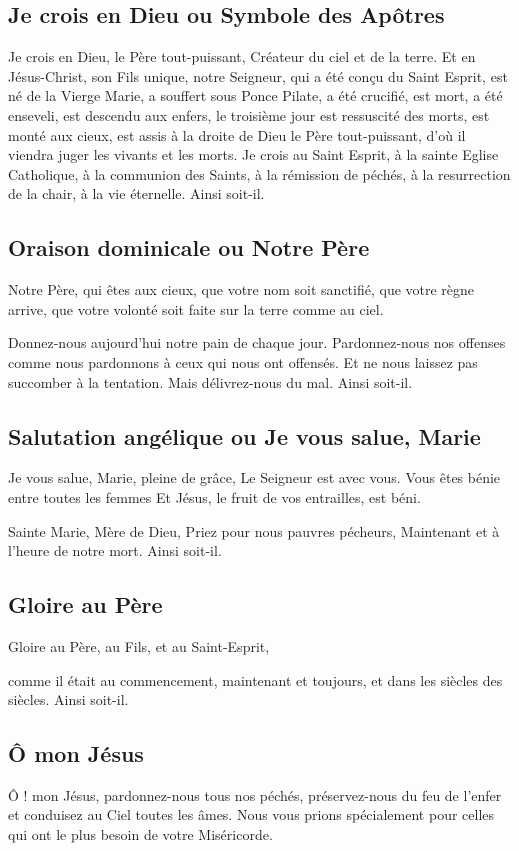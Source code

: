 
\subsection[Je crois en Dieu]{Je crois en Dieu ou Symbole des Apôtres}
Je crois en Dieu, le Père tout-puissant, Créateur du ciel et de la terre.
Et en Jésus-Christ, son Fils unique, notre Seigneur,
qui a été conçu du Saint Esprit, est né de la Vierge Marie,
a souffert sous Ponce Pilate, a été crucifié, est mort, a été enseveli,
est descendu aux enfers, le troisième jour est ressuscité des morts,
est monté aux cieux,
est assis à la droite de Dieu le Père tout-puissant,
d’où il viendra juger les vivants et les morts.
Je crois au Saint Esprit,
à la sainte Eglise Catholique,
à la communion des Saints,
à la rémission de péchés,
à la resurrection de la chair,
à la vie éternelle.
Ainsi soit-il.

\subsection[Notre Père]{Oraison dominicale ou Notre Père}
Notre Père, qui êtes aux cieux,
que votre nom soit sanctifié, que votre règne arrive,
que votre volonté soit faite sur la terre comme au ciel.

Donnez-nous aujourd’hui notre pain de chaque jour.
Pardonnez-nous nos offenses comme nous pardonnons à ceux qui nous ont offensés.
Et ne nous laissez pas succomber à la tentation.
Mais délivrez-nous du mal.
Ainsi soit-il.

\subsection[Je vous salue Marie]{Salutation angélique ou Je vous salue, Marie}
Je vous salue, Marie, pleine de grâce,
Le Seigneur est avec vous.
Vous êtes bénie entre toutes les femmes
Et Jésus, le fruit de vos entrailles, est béni.

Sainte Marie, Mère de Dieu,
Priez pour nous pauvres pécheurs,
Maintenant et à l’heure de notre mort.
Ainsi soit-il.

\subsection{Gloire au Père}
Gloire au Père, au Fils, et au Saint-Esprit,

comme il était au commencement, maintenant et toujours, et dans les siècles des siècles.
Ainsi soit-il.

\subsection{Ô mon Jésus}
Ô ! mon Jésus, pardonnez-nous tous nos péchés, préservez-nous du feu de l’enfer et conduisez au Ciel toutes les âmes. Nous vous prions spécialement pour celles qui ont le plus besoin de votre Miséricorde.